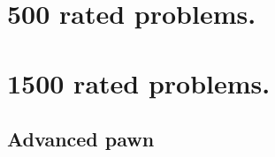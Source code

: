 \documentclass{book}
\begin{document}

 

\tableofcontents
\newpage

\chapter{500 rated problems.}
\chapter{1500 rated problems.}
\newpage 
\section{Advanced pawn}
\end{document}
